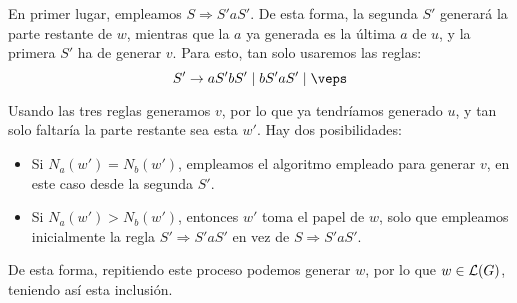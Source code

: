 \begin{ejercicio}
\begin{description}
        En primer lugar, empleamos $S\Rightarrow S'aS'$. De esta forma, la segunda $S'$ generará la parte restante de $w$, mientras que la $a$ ya generada es la última $a$ de $u$, y la primera $S'$ ha de generar $v$. Para esto, tan solo usaremos las reglas:
        \begin{equation*}
            S'\rightarrow aS'bS' \mid bS'aS' \mid \veps
        \end{equation*}
        
        Usando las tres reglas generamos $v$, por lo que ya tendríamos generado $u$, y tan solo faltaría la parte restante sea esta $w'$. 
        Hay dos posibilidades:
        \begin{itemize}
            \item Si $N_a(w')=N_b(w')$, empleamos el algoritmo empleado para generar $v$, en este caso desde la segunda $S'$.
            \item Si $N_a(w')>N_b(w')$, entonces $w'$ toma el papel de $w$, solo que empleamos inicialmente la regla $S'\Rightarrow S'aS'$ en vez de $S\Rightarrow S'aS'$.
        \end{itemize}
        De esta forma, repitiendo este proceso podemos generar $w$, por lo que $w\in \mathcal{L}(G)$, teniendo así esta inclusión.
    \end{description}
\end{ejercicio}

